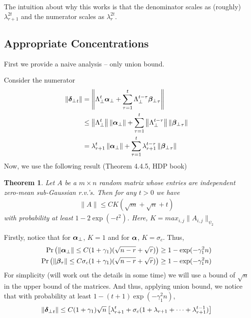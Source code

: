 \documentclass[10pt]{article}
\newtheorem{theorem}{Theorem}
\newcommand{\norm}[1]{\left\|#1\right\|}
\begin{document}
The intuition about why this works is that the denominator scales as (roughly) $\lambda_{r+1}^{2t}$ and the numerator scales as $\lambda_{r}^{2t}$. 

\subsection{Appropriate Concentrations}

{\color{blue} First we provide a naive analysis -- only union bound.  }

Consider the numerator 
\begin{align*}
\|\utsin_t\| &= \norm{\Lambda_\perp^t \usin + \sum_{\tau=1}^t \Lambda_\perp^{t-\tau} \wsin_\tau} \\
&\leq \norm{\Lambda_\perp^t} \norm{\usin} + \sum_{\tau=1}^t \norm{\Lambda_\perp^{t-\tau}} \norm{\wsin_\tau} \\
& = \lambda_{r+1}^t \norm{\usin} + \sum_{\tau=1}^t \lambda_{r+1}^{t - \tau} \norm{\wsin_\tau}
\end{align*}
Now, we use the following result (Theorem 4.4.5, HDP book)
\begin{theorem}
Let $A$ be a $m \times n$ random matrix whose entries are independent zero-mean sub-Gaussian r.v.'s. Then for any $t >0$ we have 
\begin{align*}
\|A\| \leq C K (\sqrt{m} + \sqrt{n} + t) 
\end{align*}
with probability at least $1 - 2 \exp(-t^2)$. Here, $K = max_{i,j} \|A_{i,j}\|_{\psi_2}$
\end{theorem}
Firstly, notice that for $\bm{\alpha}_{\perp}$, $K = 1$ and for $\bm{\alpha}$, $K = \sigma_c$. Thus, 
\begin{align*}
\Pr\left(\|\bm{\alpha}_{\perp}\| \leq C (1 + \gamma_1)(\sqrt{n-r} + \sqrt{r})\right) \geq  1 - \exp(- \gamma_1^2 n) \\
\Pr\left(\|\bm{\beta}_\tau\| \leq C \sigma_c (1 + \gamma_1)(\sqrt{n-r} + \sqrt{r}) \right) \geq  1 - \exp(- \gamma_1^2 n)
\end{align*}
For simplicity (will work out the  details in some time) we will use a bound of $\sqrt{n}$ in the upper bound of the matrices. And thus, applying union bound, we notice that with probability at least $1 - (t + 1) \exp(- \gamma_1^2 n)$, 
\begin{align*}
\|{\bm{\delta}_{\perp}}_t\| \leq C (1+ \gamma_1) \sqrt{n} \left[\lambda_{r+1}^t +  \sigma_c (1 + \lambda_{r+1} + \cdots +  \lambda_{r+1}^{t-1}) \right]
\end{align*}
\end{document}
